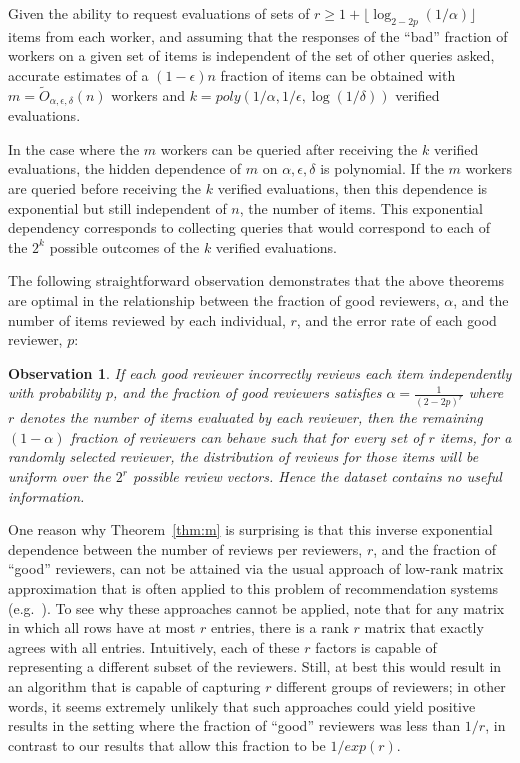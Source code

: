 \documentclass[final,12pt]{colt2018}
\newtheorem{observation}{Observation}
\newcommand{\eps}{\epsilon}
\begin{document}
\begin{theorem}\label{thm:lin}
Given the ability to request evaluations of sets of $r \ge 1+\lfloor \log_{2-2p}(1/\alpha)\rfloor$ items from each worker, and assuming that the responses of the ``bad'' fraction of workers on a given set of items is independent of the set of other queries asked, accurate estimates of a $(1-\eps)n$ fraction of items can be obtained with $m = \tilde{O}_{\alpha,\eps,\delta}(n)$ workers and $k=poly(1/\alpha,1/\eps,\log(1/\delta))$ verified evaluations.
\end{theorem}

In the case where the $m$ workers can be queried after receiving the $k$ verified evaluations, the hidden dependence of $m$ on $\alpha,\eps,\delta$ is polynomial.  If the $m$ workers are queried before receiving the $k$ verified evaluations, then this dependence is exponential but still independent of $n$, the number of items.  This exponential dependency corresponds to collecting queries that would correspond to each of the $2^k$ possible outcomes of the $k$ verified evaluations.



The following straightforward observation demonstrates that the above theorems are optimal in the relationship between the fraction of good reviewers, $\alpha$, and the number of items reviewed by each individual, $r$, and the error rate of each good reviewer, $p$:
\begin{observation}
If each good reviewer incorrectly reviews each item independently with probability $p$, and the fraction of good reviewers satisfies $\alpha = \frac{1}{(2-2p)^r}$ where $r$ denotes the number of items evaluated by each reviewer, then the remaining $(1-\alpha)$ fraction of reviewers can behave such that for every set of $r$ items, for a randomly selected reviewer, the distribution of reviews for those items will be uniform over the $2^r$ possible review vectors.  Hence the dataset contains no useful information.
\end{observation}


One reason why Theorem~\ref{thm:m} is surprising is that this inverse exponential dependence between the number of reviews per reviewers, $r$, and the fraction of ``good'' reviewers, can not be attained via the usual approach of low-rank matrix approximation that is often applied to this problem of recommendation systems (e.g.~\citep{candes2010matrix,keshavan2010matrix}).  To see why these approaches cannot be applied, note that for any matrix in which all rows have at most $r$ entries, there is a rank $r$ matrix that exactly agrees with all entries.  Intuitively, each of these $r$ factors is capable of representing a different subset of the reviewers.  Still, at best this would result in an algorithm that is capable of capturing $r$ different groups of reviewers; in other words, it seems extremely unlikely that such approaches could yield positive results in the setting where the fraction of ``good'' reviewers was less than $1/r$, in contrast to our results that allow this fraction to be $1/exp(r).$
\end{document}
